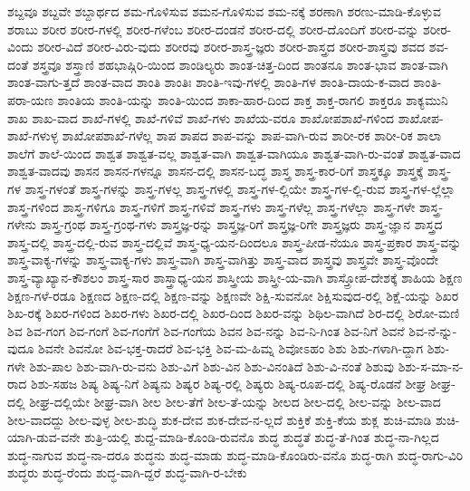 {ಶಬ್ದವೂ
ಶಬ್ದವೇ
ಶಬ್ದಾರ್ಥದ
ಶಮ-ಗೊಳಿಸುವ
ಶಮನ-ಗೊಳಿಸುವ
ಶಮ-ನಕ್ಕೆ
ಶರಣಾಗಿ
ಶರಣು-ಮಾಡಿ-ಕೊಳ್ಳುವ
ಶರಾಬು
ಶರೀರ
ಶರೀರ-ಗಳಲ್ಲಿ
ಶರೀರ-ಗಳೆಂಬ
ಶರೀರ-ದಂಡನೆ
ಶರೀರ-ದಲ್ಲಿ
ಶರೀರ-ದೊಂದಿಗೆ
ಶರೀರ-ವನ್ನು
ಶರೀರ-ವಿಂದು
ಶರೀರ-ವಿದೆ
ಶರೀರ-ವಿರು-ವುದು
ಶರೀರವು
ಶರೀರ-ಶಾಸ್ತ್ರ-ಜ್ಞರು
ಶರೀರ-ಶಾಸ್ತ್ರದ
ಶರೀರ-ಶಾಸ್ತ್ರವು
ಶವದ
ಶವ-ದಂತೆ
ಶಸ್ತ್ರವೂ
ಶಸ್ತ್ರಾಣಿ
ಶಹಭಾಷ್ಗಿರಿ-ಯಿಂದ
ಶಾಂಡಿಲ್ಯರು
ಶಾಂತ-ಚಿತ್ತ-ದಿಂದ
ಶಾಂತನೂ
ಶಾಂತ-ಭಾವ
ಶಾಂತ-ವಾಗಿ
ಶಾಂತ-ವಾಗು-ತ್ತದೆ
ಶಾಂತ-ವಾದ
ಶಾಂತಿ
ಶಾಂತಿಃ
ಶಾಂತಿ-ಇವು-ಗಳಲ್ಲಿ
ಶಾಂತಿ-ಗಳ
ಶಾಂತಿ-ದಾಯ-ಕ-ವಾದ
ಶಾಂತಿ-ಪರಾ-ಯಣ
ಶಾಂತಿಯ
ಶಾಂತಿ-ಯನ್ನು
ಶಾಂತಿ-ಯಿಂದ
ಶಾಕಾ-ಹಾರ-ದಿಂದ
ಶಾಕ್ತ
ಶಾಕ್ತ-ರಾಗಲಿ
ಶಾಕ್ತರೂ
ಶಾಕ್ಯಮುನಿ
ಶಾಖ
ಶಾಖ-ವಾದ
ಶಾಖೆ-ಗಳಲ್ಲಿ
ಶಾಖೆ-ಗಳಿವೆ
ಶಾಖೆ-ಗಳು
ಶಾಖೆಯ-ವರೂ
ಶಾಖೋಪಶಾಖೆ-ಗಳಿಂದ
ಶಾಖೋಪ-ಶಾಖೆ-ಗಳುಳ್ಳ
ಶಾಖೋಪಶಾಖೆ-ಗಳೆಲ್ಲ
ಶಾಪ
ಶಾಪದ
ಶಾಪ-ವನ್ನು
ಶಾಪ-ವಾಗಿ-ರುವ
ಶಾರೀ-ರಕ
ಶಾರೀ-ರಿಕ
ಶಾಲಾ
ಶಾಲೆಗೆ
ಶಾಲೆ-ಯಿಂದ
ಶಾಶ್ವತ
ಶಾಶ್ವತ-ವಲ್ಲ
ಶಾಶ್ವತ-ವಾಗಿ
ಶಾಶ್ವತ-ವಾಗಿಯೂ
ಶಾಶ್ವತ-ವಾಗಿ-ರು-ವಂತೆ
ಶಾಶ್ವತ-ವಾದ
ಶಾಶ್ವತ-ವಾದವು
ಶಾಸನ
ಶಾಸನ-ಗಳನ್ನೂ
ಶಾಸನ-ದಲ್ಲಿ
ಶಾಸನ-ಬದ್ಧ
ಶಾಸ್ತ್ರ
ಶಾಸ್ತ್ರ-ಕಾರ-ರಿಗೆ
ಶಾಸ್ತ್ರಕ್ಕೂ
ಶಾಸ್ತ್ರಕ್ಕೆ
ಶಾಸ್ತ್ರ-ಗಳ
ಶಾಸ್ತ್ರ-ಗಳಂತೆ
ಶಾಸ್ತ್ರ-ಗಳನ್ನು
ಶಾಸ್ತ್ರ-ಗಳಲ್ಲ
ಶಾಸ್ತ್ರ-ಗಳಲ್ಲಿ
ಶಾಸ್ತ್ರ-ಗಳ-ಲ್ಲಿಯೇ
ಶಾಸ್ತ್ರ-ಗಳ-ಲ್ಲಿ-ರುವ
ಶಾಸ್ತ್ರ-ಗಳ-ಲ್ಲೆಲ್ಲಾ
ಶಾಸ್ತ್ರ-ಗಳಿಂದ
ಶಾಸ್ತ್ರ-ಗಳಿಗೂ
ಶಾಸ್ತ್ರ-ಗಳಿಗೆ
ಶಾಸ್ತ್ರ-ಗಳಿವೆ
ಶಾಸ್ತ್ರ-ಗಳು
ಶಾಸ್ತ್ರ-ಗಳೆಲ್ಲ
ಶಾಸ್ತ್ರ-ಗಳೆಲ್ಲಾ
ಶಾಸ್ತ್ರ-ಗಳೇ
ಶಾಸ್ತ್ರ-ಗಳೇನು
ಶಾಸ್ತ್ರ-ಗ್ರಂಥ
ಶಾಸ್ತ್ರ-ಗ್ರಂಥ-ಗಳು
ಶಾಸ್ತ್ರಜ್ಞ-ರನ್ನು
ಶಾಸ್ತ್ರಜ್ಞ-ರಿಗೆ
ಶಾಸ್ತ್ರಜ್ಞ-ರಿಗೇ
ಶಾಸ್ತ್ರಜ್ಞರು
ಶಾಸ್ತ್ರ-ಜ್ಞಾನ
ಶಾಸ್ತ್ರದ
ಶಾಸ್ತ್ರ-ದಲ್ಲಿ
ಶಾಸ್ತ್ರ-ದಲ್ಲಿ-ರುವ
ಶಾಸ್ತ್ರ-ದಲ್ಲಿವೆ
ಶಾಸ್ತ್ರ-ಧ್ಯ-ಯನ-ದಿಂದಲೂ
ಶಾಸ್ತ್ರ-ಪೀಡ-ನೆಯೂ
ಶಾಸ್ತ್ರ-ಪ್ರಕಾರ
ಶಾಸ್ತ್ರ-ವನ್ನು
ಶಾಸ್ತ್ರ-ವಾಕ್ಯ-ಗಳನ್ನು
ಶಾಸ್ತ್ರ-ವಾಕ್ಯ-ಗಳು
ಶಾಸ್ತ್ರ-ವಾಗಿ
ಶಾಸ್ತ್ರ-ವಾಗಿತ್ತು
ಶಾಸ್ತ್ರ-ವಾದ
ಶಾಸ್ತ್ರವು
ಶಾಸ್ತ್ರವೇ
ಶಾಸ್ತ್ರ-ವೊಂದೇ
ಶಾಸ್ತ್ರ-ವ್ಯಾಖ್ಯಾನ-ಕೌಶಲಂ
ಶಾಸ್ತ್ರ-ಸಾರ
ಶಾಸ್ತ್ರಾಧ್ಯ-ಯನ
ಶಾಸ್ತ್ರೀಯ
ಶಾಸ್ತ್ರೀ-ಯ-ವಾಗಿ
ಶಾಸ್ತ್ರೋಪ-ದೇಶಕ್ಕೆ
ಶಾಹಿಯ
ಶಿಕ್ಷಣ
ಶಿಕ್ಷಣ-ಗಳೆ-ರಡೂ
ಶಿಕ್ಷಣದ
ಶಿಕ್ಷಣ-ದಲ್ಲಿ
ಶಿಕ್ಷಣ-ವನ್ನು
ಶಿಕ್ಷಣವೇ
ಶಿಕ್ಷಿ-ಸುವನೋ
ಶಿಕ್ಷಿಸುವುದ-ರಲ್ಲಿ
ಶಿಕ್ಷೆ-ಯನ್ನು
ಶಿಖರ
ಶಿಖ-ರಕ್ಕೆ
ಶಿಖರ-ಗಳಿಂದ
ಶಿಖರ-ಗಳು
ಶಿಖರ-ದಲ್ಲಿ
ಶಿಖರ-ದಿಂದ
ಶಿಖರ-ವನ್ನು
ಶಿಥಿಲ-ವಾಗಿದೆ
ಶಿರ-ದಲ್ಲಿ
ಶಿರೋ-ಮಣಿ
ಶಿವ
ಶಿವ-ಗಂಗ
ಶಿವ-ಗಂಗೆ
ಶಿವ-ಗಂಗೆಗೆ
ಶಿವ-ಗಂಗೆಯ
ಶಿವನ
ಶಿವ-ನನ್ನು
ಶಿವ-ನಿ-ಗಿಂತ
ಶಿವ-ನಿಗೆ
ಶಿವನೆ
ಶಿವ-ನೆ-ನ್ನು-ವುದೂ
ಶಿವನೇ
ಶಿವನೋ
ಶಿವ-ಭಕ್ತ-ರಾದರೆ
ಶಿವ-ಭಕ್ತಿ
ಶಿವ-ಮ-ಹಿಮ್ನ
ಶಿವೋಽಹಂ
ಶಿಶು
ಶಿಶು-ಗಳಾಗಿ-ದ್ದಾಗ
ಶಿಶು-ಗಳೇ
ಶಿಶು-ಪಾಲ
ಶಿಶು-ವಾಗಿ-ರು-ವನು
ಶಿಶು-ವಿಗೆ
ಶಿಶು-ವಿನ
ಶಿಶು-ವಿನಂತಿದೆ
ಶಿಶು-ವಿ-ನಂತೆ
ಶಿಶುವು
ಶಿಶು-ಸ-ಮಾ-ನ-ರಾದ
ಶಿಶು-ಸಹಜ
ಶಿಷ್ಯ
ಶಿಷ್ಯ-ನಿಗೆ
ಶಿಷ್ಯನು
ಶಿಷ್ಯರ
ಶಿಷ್ಯ-ರಲ್ಲಿ
ಶಿಷ್ಯರು
ಶಿಷ್ಯ-ರೂಪ-ದಲ್ಲಿ
ಶಿಷ್ಯ-ರೊಡನೆ
ಶೀಘ್ರ
ಶೀಘ್ರ-ದಲ್ಲಿ
ಶೀಘ್ರ-ದಲ್ಲಿಯೇ
ಶೀಘ್ರ-ವಾಗಿ
ಶೀಲ
ಶೀಲ-ತೆಗೆ
ಶೀಲ-ತೆ-ಯನ್ನು
ಶೀಲದ
ಶೀಲ-ದಲ್ಲಿ
ಶೀಲ-ವನ್ನು
ಶೀಲ-ವಾದ
ಶೀಲ-ವಾದದ್ದು
ಶೀಲ-ವುಳ್ಳ
ಶೀಲ-ಶುದ್ಧಿ
ಶುಕ-ದೇವ
ಶುಕ-ದೇವ-ನ-ಲ್ಲದೆ
ಶುಕ್ತಿಕೆ
ಶುಕ್ತಿ-ಕೆಯ
ಶುಕ್ಲ
ಶುಚಿ-ಮಾಡಿ
ಶುಚಿ-ಯಾಗಿ-ಡುವ-ವನೇ
ಶುತ್ರಿ-ಯಲ್ಲಿ
ಶುದ್ದ-ಮಾಡಿ-ಕೊಂಡಿ-ರುವನೊ
ಶುದ್ಧ
ಶುದ್ಧತೆ
ಶುದ್ಧ-ತೆ-ಗಿಂತ
ಶುದ್ಧ-ನಾ-ಗಿಲ್ಲದ
ಶುದ್ಧ-ನಾಗುವ
ಶುದ್ಧ-ನಾ-ದರೂ
ಶುದ್ಧನು
ಶುದ್ಧ-ಮಾಡು
ಶುದ್ಧ-ಮಾಡಿ-ಕೊಂಡಿರು-ವನೊ
ಶುದ್ಧ-ರಾಗಿ
ಶುದ್ಧ-ರಾಗು-ವಿರಿ
ಶುದ್ಧರು
ಶುದ್ಧ-ರೆಂದು
ಶುದ್ಧ-ವಾಗಿ-ದ್ದರೆ
ಶುದ್ಧ-ವಾಗಿ-ರ-ಬೇಕು
}
